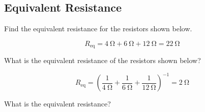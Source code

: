 \documentclass[answers]{exam}
\begin{document}
\clearpage


\subsection*{Equivalent Resistance}

\begin{questions}
\question
Find the equivalent resistance for the resistors shown below.

\begin{center}
\end{center}

\begin{solution}

\begin{equation*}
    R_\text{eq} = \SI{4}{\ohm} + \SI{6}{\ohm} + \SI{12}{\ohm} = \boxed{\SI{22}{\ohm}}    
\end{equation*}
\end{solution}

\question
What is the equivalent resistance of the resistors shown below?

\begin{center}
\end{center}

\begin{solution}

\begin{equation*}
    R_\text{eq} = \left(\frac{1}{\SI{4}{\ohm}} + \frac{1}{\SI{6}{\ohm}} + \frac{1}{\SI{12}{\ohm}}\right)^{-1} = \boxed{\SI{2}{\ohm}}    
\end{equation*}
\end{solution}

\question
What is the equivalent resistance?

\begin{center}
\end{center}


\end{questions}
\end{document}
